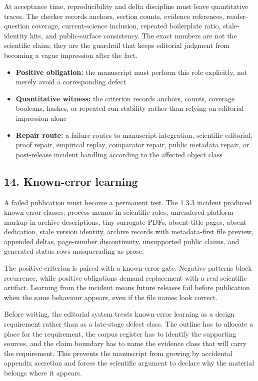 At acceptance time, reproducibility and delta discipline must leave quantitative traces. The checker records anchors, section counts, evidence references, reader-question coverage, current-science inclusion, repeated boilerplate ratio, stale-identity hits, and public-surface consistency. The exact numbers are not the scientific claim; they are the guardrail that keeps editorial judgment from becoming a vague impression after the fact.


\begin{itemize}[leftmargin=1.8em]

\item \textbf{Positive obligation:} the manuscript must perform this role explicitly, not merely avoid a corresponding defect

\item \textbf{Quantitative witness:} the criterion records anchors, counts, coverage booleans, hashes, or repeated-run stability rather than relying on editorial impression alone

\item \textbf{Repair route:} a failure routes to manuscript integration, scientific editorial, proof repair, empirical replay, comparator repair, public metadata repair, or post-release incident handling according to the affected object class

\end{itemize}

\subsection{14. Known-error learning}

A failed publication must become a permanent test. The 1.3.3 incident produced known-error classes: process memos in scientific roles, unrendered platform markup in archive descriptions, tiny surrogate PDFs, absent title pages, absent dedication, stale version identity, archive records with metadata-first file preview, appended deltas, page-number discontinuity, unsupported public claims, and generated status rows masquerading as prose.


The positive criterion is paired with a known-error gate. Negative patterns block recurrence, while positive obligations demand replacement with a real scientific artifact. Learning from the incident means future releases fail before publication when the same behaviour appears, even if the file names look correct.


Before writing, the editorial system treats known-error learning as a design requirement rather than as a late-stage defect class. The outline has to allocate a place for the requirement, the corpus register has to identify the supporting sources, and the claim boundary has to name the evidence class that will carry the requirement. This prevents the manuscript from growing by accidental appendix accretion and forces the scientific argument to declare why the material belongs where it appears.


